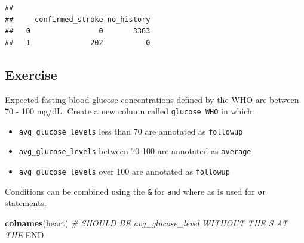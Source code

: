 \documentclass[
]{book}
\newenvironment{Shaded}{\begin{snugshade}}{\end{snugshade}}
\newcommand{\CommentTok}[1]{\textcolor[rgb]{0.56,0.35,0.01}{\textit{#1}}}
\newcommand{\ControlFlowTok}[1]{\textcolor[rgb]{0.13,0.29,0.53}{\textbf{#1}}}
\newcommand{\DecValTok}[1]{\textcolor[rgb]{0.00,0.00,0.81}{#1}}
\newcommand{\FunctionTok}[1]{\textcolor[rgb]{0.13,0.29,0.53}{\textbf{#1}}}
\newcommand{\NormalTok}[1]{#1}
\newcommand{\OtherTok}[1]{\textcolor[rgb]{0.56,0.35,0.01}{#1}}
\newcommand{\RegionMarkerTok}[1]{#1}
\newcommand{\SpecialCharTok}[1]{\textcolor[rgb]{0.81,0.36,0.00}{\textbf{#1}}}
\newcommand{\StringTok}[1]{\textcolor[rgb]{0.31,0.60,0.02}{#1}}
\providecommand{\tightlist}{%
  \setlength{\itemsep}{0pt}\setlength{\parskip}{0pt}}
\begin{document}
\begin{Shaded}
\end{Shaded}

\begin{verbatim}
##    
##     confirmed_stroke no_history
##   0                0       3363
##   1              202          0
\end{verbatim}

\subsection{Exercise}\label{exercise-8}

Expected fasting blood glucose concentrations defined by the WHO are between 70 - 100 mg/dL. Create a new column called \texttt{glucose\_WHO} in which:

\begin{itemize}
\tightlist
\item
  \texttt{avg\_glucose\_levels} less than 70 are annotated as \texttt{followup}
\item
  \texttt{avg\_glucose\_levels} between 70-100 are annotated as \texttt{average}
\item
  \texttt{avg\_glucose\_levels} over 100 are annotated as \texttt{followup}
\end{itemize}

Conditions can be combined using the \texttt{\&} for \texttt{and} where as \texttt{\textbar{}} is used for \texttt{or} statements.

\begin{Shaded}
\begin{Highlighting}[]
\FunctionTok{colnames}\NormalTok{(heart) }\CommentTok{\# SHOULD BE \textquotesingle{}avg\_glucose\_level\textquotesingle{} WITHOUT THE S AT THE }\RegionMarkerTok{END}\CommentTok{ }
\end{Highlighting}
\end{Shaded}
\end{document}
